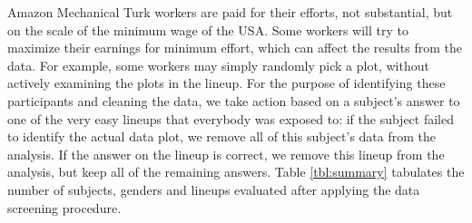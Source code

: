 \documentclass[12pt]{article}
\begin{document}
Amazon Mechanical Turk workers are paid for their efforts, not substantial, but on the scale of the minimum wage of the USA. Some workers will try to maximize their earnings for minimum effort, which can affect the results from the data. For example, some workers may simply randomly pick a plot, without actively examining the plots in the lineup. For the purpose of identifying these participants and cleaning the data, we take action based on a subject's answer to one of the very easy lineups that everybody was exposed to:
if the subject failed to identify the actual data plot, we remove all of this subject's data from the analysis. If the answer on the lineup is correct, we remove this lineup from the analysis, but keep all of the remaining answers.
Table \ref{tbl:summary} tabulates the number of subjects, genders and lineups evaluated after applying the data screening procedure. 

%
\end{document}
